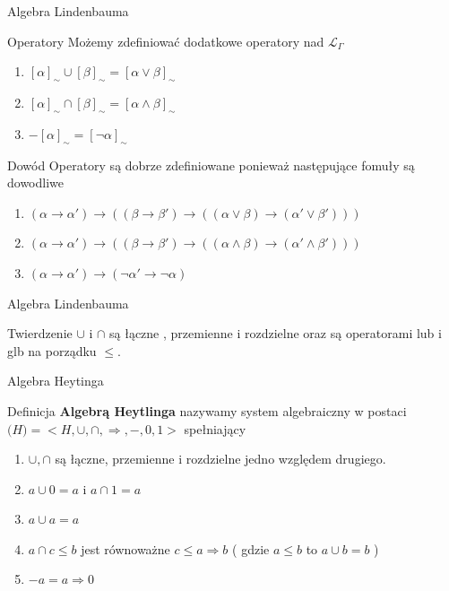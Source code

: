 \documentclass{beamer}
\begin{document}
\begin{frame}{Algebra Lindenbauma }
 \begin{block}{Operatory}
 Możemy zdefiniować dodatkowe operatory nad \( \mathcal{L}_{\Gamma} \)
 \begin{enumerate}
 \item \([\alpha]_{\sim} \cup [\beta]_{\sim} = [ \alpha \vee \beta ]_{\sim}\)
 \item \([\alpha]_{\sim} \cap [\beta]_{\sim} = [ \alpha \wedge \beta ]_{\sim}\)
  \item \(-[\alpha]_{\sim} = [\neg \alpha ]_{\sim}\)
 \end{enumerate}
 \end{block}
 
  \begin{block}{Dowód}
 Operatory są dobrze zdefiniowane ponieważ następujące fomuły są dowodliwe
 \begin{enumerate}
 \item \((\alpha \rightarrow \alpha') \rightarrow 
 (
 	(\beta \rightarrow \beta') \rightarrow
 	(( \alpha \vee \beta) \rightarrow (\alpha' \vee \beta')))\)
  \item \((\alpha \rightarrow \alpha') \rightarrow 
 (
 	(\beta \rightarrow \beta') \rightarrow
 	(( \alpha \wedge \beta) \rightarrow (\alpha' \wedge \beta')))\)
  \item \((\alpha \rightarrow \alpha') \rightarrow 
(\neg \alpha' \rightarrow \neg \alpha)\)
 \end{enumerate}
 \end{block}
 
\end{frame}

\begin{frame}{Algebra Lindenbauma }
 \begin{block}{Twierdzenie}
 \( \cup \) i \(\cap \) są łączne , przemienne i rozdzielne oraz są operatorami lub i glb na porządku \( \leq \).
 \end{block}
 
\end{frame}

\begin{frame}{Algebra Heytinga}
 \begin{block}{Definicja}
\textbf{Algebrą Heytlinga} nazywamy system algebraiczny w postaci \( \mathcal(H) = < H, \cup, \cap, \Rightarrow, - , 0 ,1 > \) spełniający 
\begin{enumerate}
	\item \(\cup, \cap\) są łączne, przemienne i rozdzielne jedno względem drugiego.
 \item \( a \cup 0 = a \) i \( a \cap 1 = a \) 
 \item \( a \cup a  = a \) 
 \item \( a \cap c \leq b \) jest równoważne \( c \leq a \Rightarrow b \) ( gdzie \( a \leq b \) to \( a \cup b  = b\) )
 \item \( -a  = a \Rightarrow 0 \)
\end{enumerate}
 \end{block}
\end{frame}
 
\end{document}
